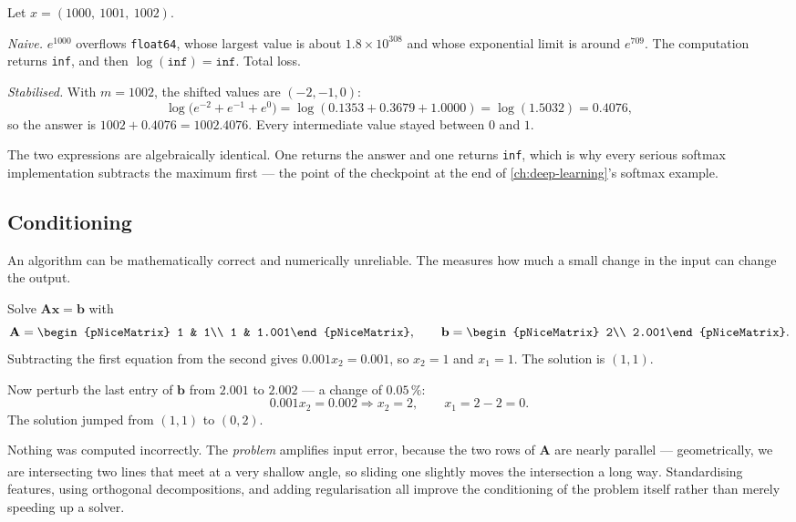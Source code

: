\begin{workedexample}
Let $x = (1000,\ 1001,\ 1002)$.

\emph{Naive.} $e^{1000}$ overflows \texttt{float64}, whose largest value is
about $1.8\times10^{308}$ and whose exponential limit is around $e^{709}$. The
computation returns \texttt{inf}, and then $\log(\texttt{inf}) =
\texttt{inf}$. Total loss.

\emph{Stabilised.} With $m = 1002$, the shifted values are $(-2,-1,0)$:
\[
  \log\bigl(e^{-2}+e^{-1}+e^{0}\bigr)
  = \log(0.1353 + 0.3679 + 1.0000)
  = \log(1.5032) = 0.4076,
\]
so the answer is $1002 + 0.4076 = 1002.4076$. Every intermediate value stayed
between $0$ and $1$.

The two expressions are algebraically identical. One returns the answer and one
returns \texttt{inf}, which is why every serious softmax implementation
subtracts the maximum first --- the point of the checkpoint at the end of
\cref{ch:deep-learning}'s softmax example.
\end{workedexample}

\subsection{Conditioning}

An algorithm can be mathematically correct and numerically unreliable. The
 measures how much a small change in the input can
change the output.

\begin{workedexample}
Solve $\mathbf{A}\mathbf{x} = \mathbf{b}$ with
\[
  \mathbf{A} = \begin{pNiceMatrix} 1 & 1\\ 1 & 1.001\end{pNiceMatrix},
  \qquad \mathbf{b} = \begin{pNiceMatrix} 2\\ 2.001\end{pNiceMatrix}.
\]
Subtracting the first equation from the second gives $0.001x_2 = 0.001$, so
$x_2 = 1$ and $x_1 = 1$. The solution is $(1,1)$.

Now perturb the last entry of $\mathbf{b}$ from $2.001$ to $2.002$ --- a change
of $0.05\,\%$:
\[
  0.001x_2 = 0.002 \Rightarrow x_2 = 2,
  \qquad x_1 = 2 - 2 = 0 .
\]
The solution jumped from $(1,1)$ to $(0,2)$.

Nothing was computed incorrectly. The \emph{problem} amplifies input error,
because the two rows of $\mathbf{A}$ are nearly parallel --- geometrically, we
are intersecting two lines that meet at a very shallow angle, so sliding one
slightly moves the intersection a long
way\textsuperscript{\cite[][ch.~1]{highamAccuracyStabilityNumerical2002}}.
Standardising features, using orthogonal decompositions, and adding
regularisation all improve the conditioning of the problem itself rather than
merely speeding up a solver.
\end{workedexample}


